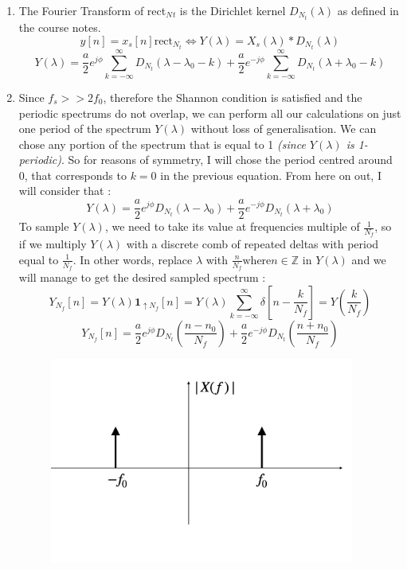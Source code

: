\documentclass[14pt]{article}
\begin{document}
\begin{enumerate}[label=\alph*)]
	\item The Fourier Transform of rect${_N{_t}}$ is the Dirichlet kernel $D_{N_{t}}(\lambda)$ as defined in the course notes.
	\begin{equation*}
	y[n] = x_s[n]\text{rect}_{N_t} \iff Y(\lambda) = X_s(\lambda)*D_{N_{t}}(\lambda)
	\end{equation*}
	\begin{equation*}
	\boxed{Y(\lambda) = \frac{a}{2}e^{j\phi}\sum_{k = -\infty}^{\infty}D_{N_{t}}(\lambda - \lambda_0 - k) +\frac{a}{2}e^{-j\phi}\sum_{k = -\infty}^{\infty}D_{N_{t}}(\lambda + \lambda_0 - k)}
	\end{equation*}
	\newpage
	\item Since $f_s >>2f_0$, therefore the Shannon condition is satisfied and the periodic spectrums do not overlap, we can perform all our calculations on just one period of the spectrum $Y(\lambda)$ without loss of generalisation. We can chose any portion of the spectrum that is equal to 1 \textit{(since $Y(\lambda)$ is 1-periodic)}. So for reasons of symmetry, I will chose the period centred around 0, that corresponds to $k=0$ in the previous equation.
	\newline \newline
	From here on out, I will consider that : 
	\begin{equation*}
	Y(\lambda) = \frac{a}{2}e^{j\phi}D_{N_t}(\lambda - \lambda_0) + \frac{a}{2}e^{-j\phi}D_{N_t}(\lambda + \lambda_0)
	\end{equation*}
	To sample $Y(\lambda)$, we need to take its value at frequencies multiple of $\frac{1}{N_f}$, so if we multiply $Y(\lambda)$ with a discrete comb of repeated deltas with period equal to $\frac{1}{N_f}$. In other words, replace $\lambda$ with $\frac{n}{N_f} \text{where} n \in \mathbb{Z}$ in $Y(\lambda)$ and we will manage to get the desired sampled spectrum : 
	\begin{equation*}
	Y_{N_f}[n] = Y(\lambda)\textbf{1}_{\uparrow N_f}[n] = 	Y(\lambda)\sum_{k = -\infty}^{\infty}\delta[n - \frac{k}{N_f}]	 = Y(\frac{k}{N_f})
	\end{equation*}
	\begin{equation*}
		Y_{N_f}[n] = \frac{a}{2}e^{j\phi}D_{N_t}(\frac{n - n_0}{N_f}) + \frac{a}{2}e^{-j\phi}D_{N_t}(\frac{n + n_0}{N_f})
	\end{equation*}
	\begin{figure}[hp]
		\centering		
		\includegraphics[width = 10cm]{1}

\end{figure}
\end{enumerate}
\end{document}
